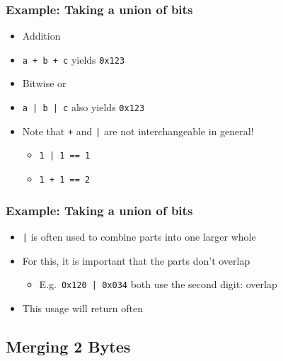 \begin{frame}
  \frametitle{Example: Taking a union of bits}
  \begin{itemize}
    \item Addition
    \item \texttt{a + b + c} yields \texttt{0x123}
  \end{itemize}
  \vskip4mm
  \begin{itemize}
    \item Bitwise or
    \item \texttt{a | b | c} also yields \texttt{0x123}
  \end{itemize}
  \vskip4mm
  \begin{itemize}
    \item Note that \texttt{+} and \texttt{|} are not interchangeable in general!
          \begin{itemize}
            \item \texttt{1 | 1 == 1}
            \item \texttt{1 + 1 == 2}
          \end{itemize}
  \end{itemize}
\end{frame}

\begin{frame}
  \frametitle{Example: Taking a union of bits}
  \begin{itemize}
    \item \texttt{|} is often used to combine parts into one larger whole
    \item For this, it is important that the parts don't overlap
          \begin{itemize}
            \item E.g.~\texttt{0x120 | 0x034} both use the second digit: overlap
          \end{itemize}
    \item This usage will return often
  \end{itemize}
\end{frame}

\subsection{Merging 2 Bytes}
\frame{\tableofcontents[currentsubsection]}


